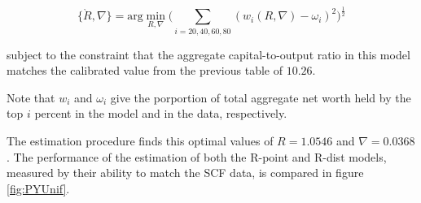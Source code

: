 $$ \{\grave{R}, \nabla\} = \text{arg}\min_{R, \nabla} \bigg( \sum_{i=20, 40, 60, 80} (w_{i}(R, \nabla)-\omega_i )^{2} \bigg)^{\frac{1}{2}} $$

\par subject to the constraint that the aggregate capital-to-output ratio in this model matches the calibrated value from the previous table of $10.26$.

\par Note that $w_i$ and $\omega_i$ give the porportion of total aggregate net worth held by the top $i$ percent in the model and in the data, respectively.

\par The estimation procedure finds this optimal values of $R = 1.0546$ and $\nabla = 0.0368$. The performance of the estimation of both the R-point and R-dist models, measured by their ability to match the SCF data, is compared in figure \ref{fig:PYUnif}.

